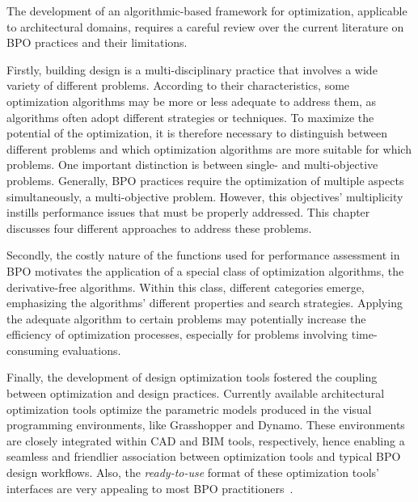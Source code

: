 \cleardoublepage
\label{chap:back}

	The development of an algorithmic-based framework for optimization, applicable to architectural domains, requires a careful review over the current literature on \ac{BPO} practices and their limitations. 
	
	Firstly, building design is a multi-disciplinary practice that involves a wide variety of different problems. According to their characteristics, some optimization algorithms may be more or less adequate to address them, as algorithms often adopt different strategies or techniques. To maximize the potential of the optimization, it is therefore necessary to distinguish between different problems and which optimization algorithms are more suitable for which problems. One important distinction is between single- and multi-objective problems. Generally, \ac{BPO} practices require the optimization of multiple aspects simultaneously, a multi-objective problem. However, this objectives' multiplicity instills performance issues that must be properly addressed. This chapter discusses four different approaches to address these problems.
	
	Secondly, the costly nature of the functions used for performance assessment in \ac{BPO} motivates the application of a special class of optimization algorithms, the derivative-free algorithms. Within this class, different categories emerge, emphasizing the algorithms' different properties and search strategies. Applying the adequate algorithm to certain problems may potentially increase the efficiency of optimization processes, especially for problems involving time-consuming evaluations.
	
	Finally, the development of design optimization tools fostered the coupling between optimization and design practices. Currently available architectural optimization tools optimize the parametric models produced in the visual programming environments, like Grasshopper and Dynamo. These environments are closely integrated within \ac{CAD} and \ac{BIM} tools, respectively, hence enabling a seamless and friendlier association between optimization tools and typical \ac{BPO} design workflows. Also, the \textit{ready-to-use} format of these optimization tools' interfaces are very appealing to most \ac{BPO} practitioners~\cite{Cichocka2017SURVEY}.
	
